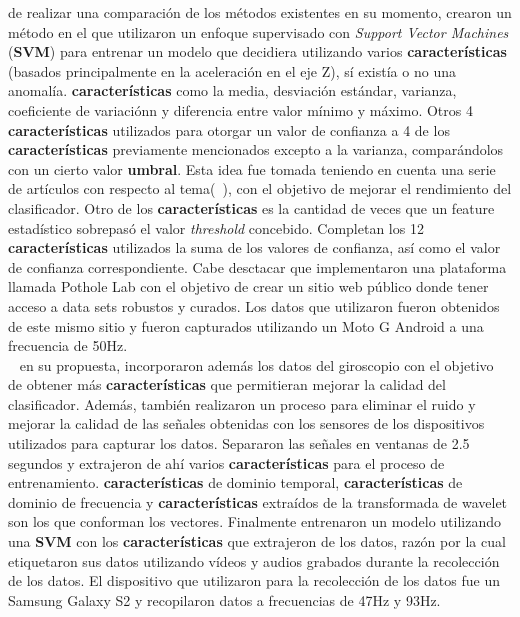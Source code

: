 		 de realizar una comparación de los métodos existentes en su momento, crearon un método en el que utilizaron
		un enfoque supervisado con \emph{Support Vector Machines} (\textbf{SVM}) para entrenar un modelo que decidiera utilizando varios \textbf{características}
		(basados principalmente en la aceleración en el eje Z), sí existía o no una anomalía. \textbf{características} como la media, desviación estándar, varianza,
		coeficiente de variaciónn y diferencia entre valor mínimo y máximo. Otros 4 \textbf{características} utilizados para otorgar un valor de confianza
		a 4 de los \textbf{características} previamente mencionados excepto a la varianza, comparándolos con un cierto valor \textbf{umbral}. Esta idea
		fue tomada teniendo en cuenta una serie de artículos con respecto al tema(~), con el objetivo de mejorar el
		rendimiento del clasificador. Otro de los \textbf{características} es la cantidad de veces que un feature estadístico sobrepasó el valor \emph
		{threshold} concebido. Completan los 12 \textbf{características} utilizados la suma de los valores de confianza, así como el valor de confianza
		correspondiente. Cabe desctacar que implementaron una plataforma llamada Pothole Lab con el objetivo de crear un sitio web público donde
		tener acceso a data sets robustos y curados. Los datos que utilizaron fueron obtenidos de este mismo sitio y fueron capturados utilizando
		un Moto G Android a una frecuencia de 50Hz.\\

		~ en su propuesta, incorporaron además los datos del giroscopio con el objetivo de obtener más \textbf{características}
		que permitieran mejorar la calidad del clasificador. Además, también realizaron un proceso para eliminar el ruido y mejorar la calidad de
		las señales obtenidas con los sensores de los dispositivos utilizados para capturar los datos. Separaron las señales en ventanas de 2.5
		segundos y extrajeron de ahí varios \textbf{características} para el proceso de entrenamiento. \textbf{características} de dominio temporal, \textbf{características}
		de dominio de frecuencia y \textbf{características} extraídos de la transformada de wavelet son los que conforman los vectores. Finalmente entrenaron
		un modelo utilizando una \textbf{SVM} con los \textbf{características} que extrajeron de los datos, razón por la cual etiquetaron sus datos utilizando
		vídeos y audios grabados durante la recolección de los datos. El dispositivo que utilizaron para la recolección de los datos fue un Samsung
		Galaxy S2 y recopilaron datos a frecuencias de 47Hz y 93Hz.\\

